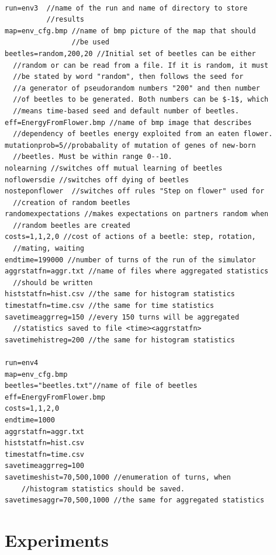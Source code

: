 \documentclass[a4paper,12pt]{report}
\begin{document}
\begin{verbatim} 

run=env3  //name of the run and name of directory to store 
          //results
map=env_cfg.bmp //name of bmp picture of the map that should 
                //be used 
beetles=random,200,20 //Initial set of beetles can be either 
  //random or can be read from a file. If it is random, it must 
  //be stated by word "random", then follows the seed for 
  //a generator of pseudorandom numbers "200" and then number 
  //of beetles to be generated. Both numbers can be $-1$, which 
  //means time-based seed and default number of beetles.
eff=EnergyFromFlower.bmp //name of bmp image that describes 
  //dependency of beetles energy exploited from an eaten flower.
mutationprob=5//probabality of mutation of genes of new-born
  //beetles. Must be within range 0--10.
nolearning //switches off mutual learning of beetles
noflowersdie //switches off dying of beetles
nosteponflower	//switches off rules "Step on flower" used for 
  //creation of random beetles
randomexpectations //makes expectations on partners random when 
  //random beetles are created
costs=1,1,2,0 //cost of actions of a beetle: step, rotation, 
  //mating, waiting
endtime=199000 //number of turns of the run of the simulator
aggrstatfn=aggr.txt //name of files where aggregated statistics 
  //should be written
histstatfn=hist.csv //the same for histogram statistics
timestatfn=time.csv //the same for time statistics
savetimeaggrreg=150 //every 150 turns will be aggregated 
  //statistics saved to file <time><aggrstatfn>
savetimehistreg=200 //the same for histogram statistics

run=env4
map=env_cfg.bmp
beetles="beetles.txt"//name of file of beetles
eff=EnergyFromFlower.bmp
costs=1,1,2,0
endtime=1000
aggrstatfn=aggr.txt
histstatfn=hist.csv
timestatfn=time.csv
savetimeaggrreg=100
savetimeshist=70,500,1000 //enumeration of turns, when
    //histogram statistics should be saved. 
savetimesaggr=70,500,1000 //the same for aggregated statistics

\end{verbatim}




\chapter{Experiments}
\end{document}
